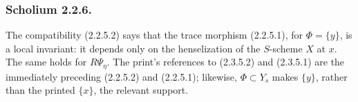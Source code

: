 \subsubsection*{Scholium 2.2.6.}
The compatibility (2.2.5.2) says that the trace morphism (2.2.5.1),
for $\Phi=\{y\}$, is a local invariant: it depends only on the
henselization of the $S$-scheme $X$ at $x$.  The same holds for
$R\Psi_\eta$.  The print's references to (2.3.5.2) and (2.3.5.1) are
the immediately preceding (2.2.5.2) and (2.2.5.1); likewise,
$\Phi\subset Y_s$ makes $\{y\}$, rather than the printed $\{x\}$,
the relevant support.
